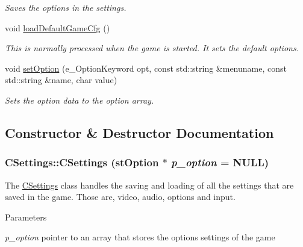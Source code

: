 \begin{DoxyCompactItemize}
\begin{DoxyCompactList}\small\item\em Saves the options in the settings. \item\end{DoxyCompactList}\item 
\hypertarget{class_c_settings_a789f42c0ed0113cdedac8f5d97317431}{
void \hyperlink{class_c_settings_a789f42c0ed0113cdedac8f5d97317431}{loadDefaultGameCfg} ()}
\label{class_c_settings_a789f42c0ed0113cdedac8f5d97317431}

\begin{DoxyCompactList}\small\item\em This is normally processed when the game is started. It sets the default options. \item\end{DoxyCompactList}\item 
void \hyperlink{class_c_settings_ab6d30212b51e791ddca78aeb735e45b4}{setOption} (e\_\-OptionKeyword opt, const std::string \&menuname, const std::string \&name, char value)
\begin{DoxyCompactList}\small\item\em Sets the option data to the option array. \item\end{DoxyCompactList}\end{DoxyCompactItemize}


\subsection{Constructor \& Destructor Documentation}
\hypertarget{class_c_settings_a5865e8e8e7e1caa507b2fc0c6118f3e3}{
\subsubsection[{CSettings}]{\setlength{\rightskip}{0pt plus 5cm}CSettings::CSettings ({\bf stOption} $\ast$ {\em p\_\-option} = {\ttfamily NULL})}}
\label{class_c_settings_a5865e8e8e7e1caa507b2fc0c6118f3e3}


The \hyperlink{class_c_settings}{CSettings} class handles the saving and loading of all the settings that are saved in the game. Those are, video, audio, options and input. 


\begin{DoxyParams}{Parameters}
\item[{\em p\_\-option}]pointer to an array that stores the options settings of the game \end{DoxyParams}



